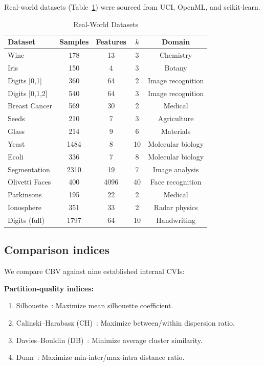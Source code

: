 \documentclass[journal]{IEEEtran}
\begin{document}
Real-world datasets (Table~\ref{tab:real}) were sourced from UCI, OpenML, and scikit-learn.

\begin{table}[t]
\centering
\caption{Real-World Datasets}
\label{tab:real}
\small
\begin{tabular}{lcccc}
\toprule
Dataset & Samples & Features & $k$ & Domain\\
\midrule
Wine & 178 & 13 & 3 & Chemistry\\
Iris & 150 & 4 & 3 & Botany\\
Digits [0,1] & 360 & 64 & 2 & Image recognition\\
Digits [0,1,2] & 540 & 64 & 3 & Image recognition\\
Breast Cancer & 569 & 30 & 2 & Medical\\
Seeds & 210 & 7 & 3 & Agriculture\\
Glass & 214 & 9 & 6 & Materials\\
Yeast & 1484 & 8 & 10 & Molecular biology\\
Ecoli & 336 & 7 & 8 & Molecular biology\\
Segmentation & 2310 & 19 & 7 & Image analysis\\
Olivetti Faces & 400 & 4096 & 40 & Face recognition\\
Parkinsons & 195 & 22 & 2 & Medical\\
Ionosphere & 351 & 33 & 2 & Radar physics\\
Digits (full) & 1797 & 64 & 10 & Handwriting\\
\bottomrule
\end{tabular}
\end{table}

\subsection{Comparison indices}
\label{sec:indices}

We compare CBV against nine established internal CVIs:

\textbf{Partition-quality indices:}
\begin{enumerate}
    \item Silhouette~\cite{rousseeuw1987silhouettes}: Maximize mean silhouette coefficient.
    \item Calinski--Harabasz (CH)~\cite{calinski1974dendrite}: Maximize between/within dispersion ratio.
    \item Davies--Bouldin (DB)~\cite{davies1979cluster}: Minimize average cluster similarity.
    \item Dunn~\cite{dunn1973fuzzy}: Maximize min-inter/max-intra distance ratio.
\end{enumerate}
\end{document}
